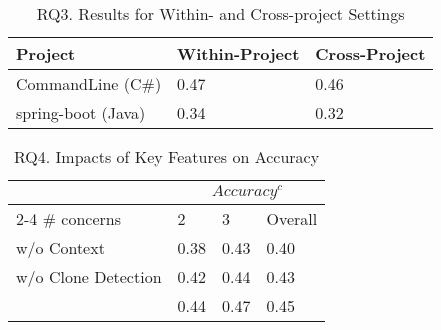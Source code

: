 
\begin{table}[t]
	\caption{RQ3. Results for Within- and Cross-project Settings}
	\vspace{-12pt}
	\begin{center}
		\small
		\tabcolsep 3pt
		\renewcommand{\arraystretch}{1} \begin{tabular}{p{2.2cm}<{\centering}|p{2.6cm}<{\centering}|p{2.6cm}<{\centering}}
			
			\hline
			Project     & Within-Project & Cross-Project\\
			
			\hline
			CommandLine (C\#)   &       0.47         &		0.46	       \\
           spring-boot (Java)   &      0.34          &		0.32	       \\

			\hline
		\end{tabular}
		\label{RQ3-result}
	\end{center}
\end{table}

\begin{table}[t]
	\caption{RQ4. Impacts of Key Features on Accuracy}
	\vspace{-12pt}
	\begin{center}
		\small
		\tabcolsep 4pt
		\renewcommand{\arraystretch}{1} \begin{tabular}{p{3.5cm}<{\centering}|p{0.8cm}<{\centering}p{0.8cm}<{\centering}p{0.8cm}<{\centering}}
			
			\hline
			       \multirow{2}{*}{}                  & \multicolumn{3}{c}{$Accuracy^c$}\\
			                         \cline{2-4}
			    \# concerns                     & 2 & 3& Overall\\
			\hline

			\tool w/o Context        &  0.38 & 0.43  &   0.40        \\
			\tool w/o Clone Detection     &  0.42 & 0.44  &   0.43        \\
       			\tool                    &  0.44 & 0.47  &   0.45        \\
			\hline
		\end{tabular}
		\label{RQ4-result-1}
	\end{center}
\end{table}


